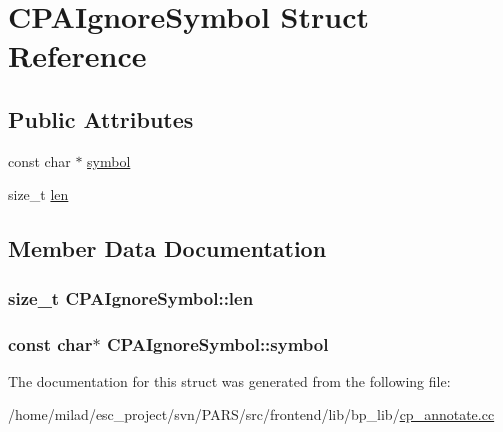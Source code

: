 \hypertarget{structCPAIgnoreSymbol}{
\section{CPAIgnoreSymbol Struct Reference}
\label{structCPAIgnoreSymbol}
}
\subsection*{Public Attributes}
\begin{DoxyCompactItemize}
\item 
const char $\ast$ \hyperlink{structCPAIgnoreSymbol_a265879e6ec7f93a832c5fded66f1c073}{symbol}
\item 
size\_\-t \hyperlink{structCPAIgnoreSymbol_a06e56fe2b2f6f3344c2a941ad21e142d}{len}
\end{DoxyCompactItemize}


\subsection{Member Data Documentation}
\hypertarget{structCPAIgnoreSymbol_a06e56fe2b2f6f3344c2a941ad21e142d}{
\subsubsection[{len}]{\setlength{\rightskip}{0pt plus 5cm}size\_\-t {\bf CPAIgnoreSymbol::len}}}
\label{structCPAIgnoreSymbol_a06e56fe2b2f6f3344c2a941ad21e142d}
\hypertarget{structCPAIgnoreSymbol_a265879e6ec7f93a832c5fded66f1c073}{
\subsubsection[{symbol}]{\setlength{\rightskip}{0pt plus 5cm}const char$\ast$ {\bf CPAIgnoreSymbol::symbol}}}
\label{structCPAIgnoreSymbol_a265879e6ec7f93a832c5fded66f1c073}


The documentation for this struct was generated from the following file:\begin{DoxyCompactItemize}
\item 
/home/milad/esc\_\-project/svn/PARS/src/frontend/lib/bp\_\-lib/\hyperlink{cp__annotate_8cc}{cp\_\-annotate.cc}\end{DoxyCompactItemize}
